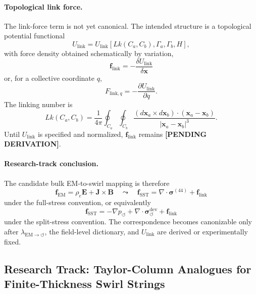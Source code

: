 \paragraph{Topological link force.}
The link-force term is not yet canonical.  The intended structure is a
topological potential functional
\[
U_{\mathrm{link}}
=
U_{\mathrm{link}}\!\left[
Lk(C_a,C_b),\Gamma_a,\Gamma_b,H
\right],
\]
with force density obtained schematically by variation,
\[
\boxed{
\mathbf f_{\mathrm{link}}
=
-\frac{\delta U_{\mathrm{link}}}{\delta \mathbf x}
}
\]
or, for a collective coordinate \(q\),
\[
\boxed{
F_{\mathrm{link},q}
=
-\frac{\partial U_{\mathrm{link}}}{\partial q}.
}
\]
The linking number is
\[
Lk(C_a,C_b)
=
\frac{1}{4\pi}
\oint_{C_a}\oint_{C_b}
\frac{
(d\mathbf x_a\times d\mathbf x_b)\cdot(\mathbf x_a-\mathbf x_b)
}{
|\mathbf x_a-\mathbf x_b|^3
}.
\]
Until \(U_{\mathrm{link}}\) is specified and normalized,
\(\mathbf f_{\mathrm{link}}\) remains
\textbf{[PENDING DERIVATION]}.

\paragraph{Research-track conclusion.}
The candidate bulk EM-to-swirl mapping is therefore
\[
\boxed{
\mathbf f_{\mathrm{EM}}
=
\rho_e\mathbf E+\mathbf J\times\mathbf B
\quad\leadsto\quad
\mathbf f_{\mathrm{SST}}
=
\nabla\cdot\boldsymbol{\sigma}^{(44)}
+
\mathbf f_{\mathrm{link}}
}
\]
under the full-stress convention, or equivalently
\[
\boxed{
\mathbf f_{\mathrm{SST}}
=
-\nabla p_{\circlearrowleft}
+
\nabla\cdot\boldsymbol{\sigma}^{\mathrm{dev}}_{\circlearrowleft}
+
\mathbf f_{\mathrm{link}}
}
\]
under the split-stress convention.  The correspondence becomes canonizable
only after
\(\lambda_{\mathrm{EM}\to\circlearrowleft}\),
the field-level dictionary, and
\(U_{\mathrm{link}}\)
are derived or experimentally fixed.



\subsection{Research Track: Taylor-Column Analogues for Finite-Thickness Swirl Strings}
\label{sec:taylor_column_finite_thickness_swirl_strings}

\providecommand{\rhoF}{\rho_{\!f}}
\providecommand{\vSwirl}{\mathbf{v}_{\!\boldsymbol{\circlearrowleft}}}
\providecommand{\rc}{r_c}
\providecommand{\GammaK}{\Gamma_K}
\providecommand{\GammaZero}{\Gamma_0}
\providecommand{\Om}{\Omega}
\providecommand{\Ht}{\mathcal{H}_{\times}}

